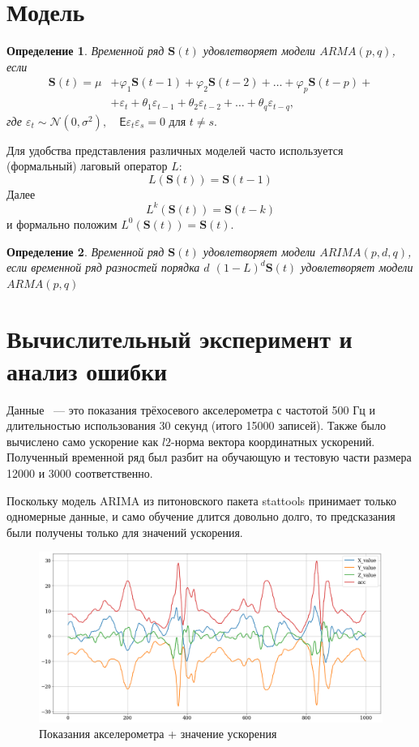 \documentclass[a4paper,14pt]{article}
\renewcommand{\epsilon}{\ensuremath{\varepsilon}}
\renewcommand{\phi}{\ensuremath{\varphi}}
\newcommand{\bS}{\mathbf{S}}
\theoremstyle{plain} %
\newtheorem{definition}{Определение}
\theoremstyle{definition} %
\theoremstyle{remark} %
\begin{document}
	\section{Модель} \label{model_descr}
	\begin{definition} 
		Временной ряд $\bS(t)$ удовлетворяет модели $ARMA(p, q)$, если
		\begin{equation*}
			\begin{split}
				\bS(t) = \mu &+ \phi_1 \bS(t-1) + \phi_2 \bS(t-2) + \ldots + \phi_p \bS(t-p) + \\ &+ \epsilon_t + \theta_1 \epsilon_{t-1} + 
				\theta_2 \epsilon_{t-2} + \ldots + \theta_q \epsilon_{t-q},
			\end{split}
		\end{equation*}
		где $\epsilon_t \sim \mathcal{N}(0, \sigma^2), \quad \mathsf{E}\epsilon_t\epsilon_s = 0 \text{ для } t \neq s.$
	\end{definition}
	
	Для удобства представления различных моделей часто используется
	(формальный) лаговый оператор $L$:
		\[ L(\bS(t)) = \bS(t-1)\]
	Далее
		\[ L^k(\bS(t)) = \bS(t-k) \]
	и формально положим $L^0(\bS(t)) = \bS(t).$
	
	\begin{definition}
		Временной ряд $\bS(t)$ удовлетворяет модели $ARIMA(p, d, q)$, если временной ряд разностей порядка $d$ $(1 - L)^d \bS(t)$ удовлетворяет модели $ARMA(p, q)$
	\end{definition}
	
	\section{Вычислительный эксперимент и анализ ошибки}
	Данные ~--- это показания трёхосевого акселерометра с частотой 500 Гц и длительностью использования 30 секунд (итого 15000 записей).  
	Также было вычислено само ускорение как $l2\text{-норма}$ вектора координатных ускорений. Полученный временной ряд был разбит на обучающую и тестовую части размера 12000 и 3000 соответственно.  
	
	Поскольку модель ARIMA из питоновского пакета stattools принимает только одномерные данные, и само обучение длится довольно долго, то предсказания были получены только для значений ускорения.
	
	\begin{figure}[bhtp]
		\centering
		\includegraphics[width=\linewidth]{acc_data.png}
		\caption{Показания акселерометра + значение ускорения}
	\end{figure}
	
\end{document}
